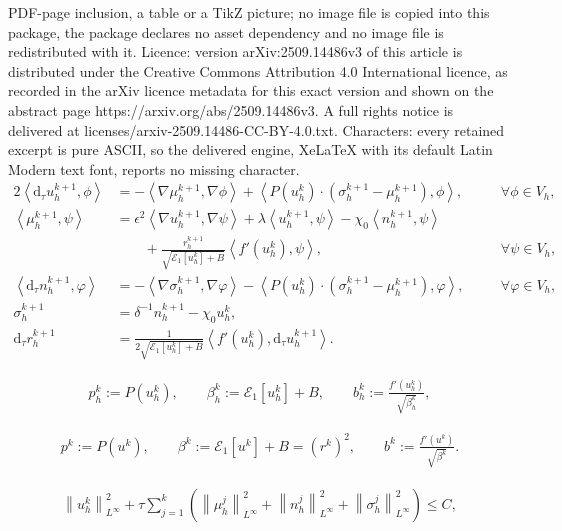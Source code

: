 \documentclass[10pt,a4paper]{amsart}
\newcommand{\dtt}{\mathrm{d}_\tau}
\newcommand{\inpro}[2]{\left\langle#1,#2\right\rangle}
\newcommand{\norm}[2]{\left\|{#1}\right\|_{#2}}
\begin{document}
PDF-page inclusion, a table or a TikZ picture; no image file is copied into this package, the package declares no asset dependency and no image file is redistributed with it. Licence: version arXiv:2509.14486v3 of this article is distributed under the Creative Commons Attribution 4.0 International licence, as recorded in the arXiv licence metadata for this exact version and shown on the abstract page https://arxiv.org/abs/2509.14486v3. A full rights notice is delivered at licenses/arxiv-2509.14486-CC-BY-4.0.txt. Characters: every retained excerpt is pure ASCII, so the delivered engine, XeLaTeX with its default Latin Modern text font, reports no missing character.
	\begin{alignat}{2}
		\label{equ:fem euler u}
		\inpro{\dtt u_h^{k+1}}{\phi}
		&=
		-\inpro{\nabla \mu_h^{k+1}}{\nabla \phi}
		+
		\inpro{P(u_h^k)\cdot (\sigma_h^{k+1}-\mu_h^{k+1})}{\phi}, \quad &&\forall \phi \in V_h,
		\\
		\inpro{\mu_h^{k+1}}{\psi}
		&=
		\epsilon^2 \inpro{\nabla u_h^{k+1}}{\nabla \psi}
		+
		\lambda \inpro{u_h^{k+1}}{\psi}
		-
		\chi_0 \inpro{n_h^{k+1}}{\psi}
		\nonumber\\
		\label{equ:fem euler mu}
		&\qquad
		+
		\frac{r_h^{k+1}}{\sqrt{\mathcal{E}_1[u_h^k]+B}} \inpro{f'(u_h^k)}{\psi}, \quad &&\forall \psi\in V_h,
		\\
		\label{equ:fem euler n}
		\inpro{\dtt n_h^{k+1}}{\varphi}
		&=
		-\inpro{\nabla \sigma_h^{k+1}}{\nabla \varphi}
		-
		\inpro{P(u_h^k)\cdot (\sigma_h^{k+1}-\mu_h^{k+1})}{\varphi}, \quad &&\forall \varphi \in V_h,
		\\
		\label{equ:fem euler sigma}
		\sigma_h^{k+1}
		&=
		\delta^{-1} n_h^{k+1}
		-
		\chi_0 u_h^k,
		\\
		\label{equ:fem euler r}
		\dtt r_h^{k+1}
		&=
		\frac{1}{2\sqrt{\mathcal{E}_1[u_h^k]+B}}
		\inpro{f'(u_h^k)}{\dtt u_h^{k+1}}.
	\end{alignat}

\begin{align}\label{equ:phk bhk}
	p_h^k:=P(u_h^k),
	\qquad
	\beta_h^k := \mathcal E_1[u_h^k]+B,
	\qquad
	b_h^k:=
	\frac{f'(u_h^k)}{\sqrt{\beta_h^k}},
\end{align}

\begin{align}\label{equ:beta k bk}
	p^k :=P(u^k),
	\qquad
	\beta^k := \mathcal E_1[u^k]+B = (r^k)^2,
	\qquad
	b^k:=
	\frac{f'(u^k)}{\sqrt{\beta^k}}.
\end{align}

\begin{align}\label{equ:stab u Linfty}
	\norm{u_h^k}{L^\infty}^2
    +
    \tau \sum_{j=1}^k \left(\norm{\mu_h^j}{L^\infty}^2 + \norm{n_h^j}{L^\infty}^2 + \norm{\sigma_h^j}{L^\infty}^2 \right) \leq C,
\end{align}
\end{document}

